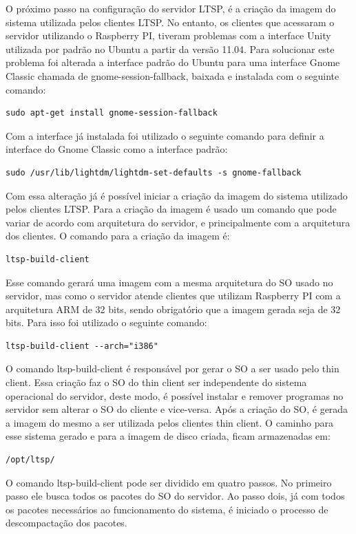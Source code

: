 \documentclass[
	12pt,				%
	openright,			%
	twoside,			%
	a4paper,			%
	chapter=TITLE,		%
	english,			%
	brazil				%
	]{abntex2}
\begin{document}
O próximo passo na configuração do servidor LTSP, é a criação da imagem do sistema utilizada pelos clientes LTSP. No entanto, os clientes que acessaram o servidor utilizando o Raspberry PI, tiveram problemas com a interface Unity utilizada por padrão no Ubuntu a partir da versão 11.04. Para solucionar este problema foi alterada a interface padrão do Ubuntu para uma interface Gnome Classic chamada de gnome-session-fallback, baixada e instalada com o seguinte comando:
\begin{verbatim}
sudo apt-get install gnome-session-fallback
\end{verbatim}
Com a interface já instalada foi utilizado o seguinte comando para definir a interface do Gnome Classic como a interface padrão:
\begin{verbatim}
sudo /usr/lib/lightdm/lightdm-set-defaults -s gnome-fallback
\end{verbatim}
Com essa alteração já é possível iniciar a criação da imagem do sistema utilizado pelos  clientes LTSP. Para a criação da imagem é usado um comando que pode variar de acordo com arquitetura do servidor, e principalmente com a arquitetura dos clientes. O comando para a criação da imagem é:
\begin{verbatim}
ltsp-build-client
\end{verbatim}
Esse comando gerará uma imagem com a mesma arquitetura do SO usado no servidor, mas como o servidor atende clientes que utilizam Raspberry PI com a arquitetura ARM de 32 bits, sendo obrigatório que a imagem gerada seja de 32 bits. Para isso  foi utilizado o seguinte comando:
\begin{verbatim}
ltsp-build-client --arch="i386" 
\end{verbatim}
O comando ltsp-build-client é responsável por gerar o SO a ser usado pelo thin client. Essa criação faz o SO do thin client ser independente do sistema operacional do servidor, deste modo, é possível instalar e remover programas no servidor sem alterar o SO do cliente e vice-versa. Após a criação do SO, é gerada a imagem do mesmo a ser utilizada pelos clientes thin client. O caminho para esse sistema gerado e para a imagem de disco criada, ficam armazenadas em:

\begin{verbatim}
/opt/ltsp/
\end{verbatim}

O comando ltsp-build-client pode ser dividido em quatro passos. No primeiro passo ele busca todos os pacotes do SO do servidor. Ao passo dois, já com todos os pacotes necessários ao funcionamento do sistema, é iniciado o processo de descompactação dos pacotes. 
\end{document}
